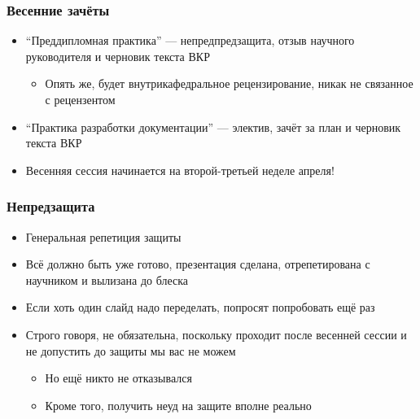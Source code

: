 \documentclass{../../slides-style}
\begin{document}
    \begin{frame}
        \frametitle{Весенние зачёты}
        \begin{itemize}
            \item ``Преддипломная практика'' --- непредпредзащита, отзыв научного руководителя и черновик текста ВКР
            \begin{itemize}
                \item Опять же, будет внутрикафедральное рецензирование, никак не связанное с рецензентом
            \end{itemize}
            \item ``Практика разработки документации'' --- электив, зачёт за план и черновик текста ВКР
            \item Весенняя сессия начинается на второй-третьей неделе апреля!
        \end{itemize}
    \end{frame}

    \begin{frame}
        \frametitle{Непредзащита}
        \begin{itemize}
            \item Генеральная репетиция защиты
            \item Всё должно быть уже готово, презентация сделана, отрепетирована с научником и вылизана до блеска
            \item Если хоть один слайд надо переделать, попросят попробовать ещё раз
            \item Строго говоря, не обязательна, поскольку проходит после весенней сессии и не допустить до защиты мы вас не можем
            \begin{itemize}
                \item Но ещё никто не отказывался
                \item Кроме того, получить неуд на защите вполне реально
            \end{itemize}
        \end{itemize}
    \end{frame}
\end{document}
